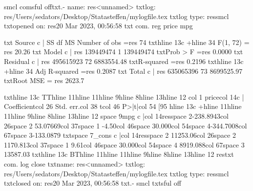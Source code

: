 {smcl}
{com}{sf}{ul off}{txt}{.-}
      name:  {res}<unnamed>
       {txt}log:  {res}/Users/sedators/Desktop/Statasteffen/mylogfile.tex
  {txt}log type:  {res}smcl
 {txt}opened on:  {res}20 Mar 2023, 00:56:58
{txt}
{com}. reg price mpg

{txt}      Source {c |}       SS           df       MS      Number of obs   ={res}        74
{txt}{hline 13}{c +}{hline 34}   F(1, 72)        = {res}    20.26
{txt}       Model {c |} {res}  139449474         1   139449474   {txt}Prob > F        ={res}    0.0000
{txt}    Residual {c |} {res}  495615923        72  6883554.48   {txt}R-squared       ={res}    0.2196
{txt}{hline 13}{c +}{hline 34}   Adj R-squared   ={res}    0.2087
{txt}       Total {c |} {res}  635065396        73  8699525.97   {txt}Root MSE        =   {res} 2623.7

{txt}{hline 13}{c TT}{hline 11}{hline 11}{hline 9}{hline 8}{hline 13}{hline 12}
{col 1}       price{col 14}{c |} Coefficient{col 26}  Std. err.{col 38}      t{col 46}   P>|t|{col 54}     [95%
{hline 13}{c +}{hline 11}{hline 11}{hline 9}{hline 8}{hline 13}{hline 12}
{space 9}mpg {c |}{col 14}{res}{space 2}-238.8943{col 26}{space 2} 53.07669{col 37}{space 1}   -4.50{col 46}{space 3}0.000{col 54}{space 4}-344.7008{col 67}{space 3}-133.0879
{txt}{space 7}_cons {c |}{col 14}{res}{space 2} 11253.06{col 26}{space 2} 1170.813{col 37}{space 1}    9.61{col 46}{space 3}0.000{col 54}{space 4} 8919.088{col 67}{space 3} 13587.03
{txt}{hline 13}{c BT}{hline 11}{hline 11}{hline 9}{hline 8}{hline 13}{hline 12}
{res}{txt}
{com}. log close
      {txt}name:  {res}<unnamed>
       {txt}log:  {res}/Users/sedators/Desktop/Statasteffen/mylogfile.tex
  {txt}log type:  {res}smcl
 {txt}closed on:  {res}20 Mar 2023, 00:56:58
{txt}{.-}
{smcl}
{txt}{sf}{ul off}